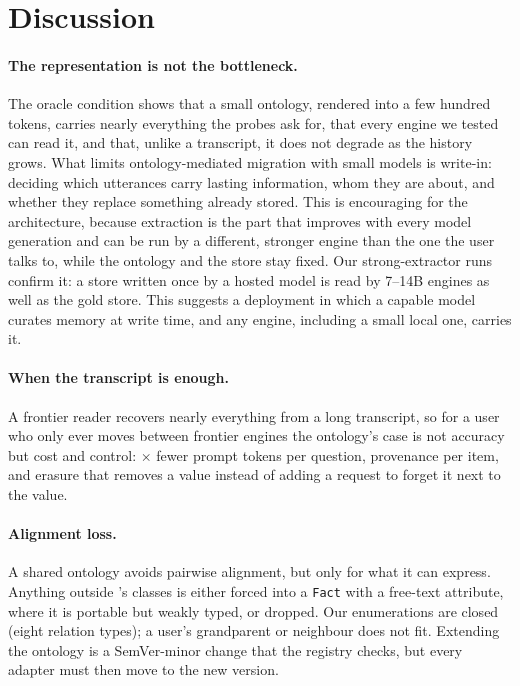\section{Discussion}\label{sec:discussion}

\paragraph{The representation is not the bottleneck.} The oracle condition shows that a small
ontology, rendered into a few hundred tokens, carries nearly everything the probes ask for, that
every engine we tested can read it, and that, unlike a transcript, it does not degrade as the
history grows. What limits
ontology-mediated migration with small models is write-in: deciding which utterances carry lasting
information, whom they are about, and whether they replace something already stored. This is
encouraging for the architecture, because extraction is the part that improves with every model
generation and can be run by a different, stronger engine than the one the user talks to, while
the ontology and the store stay fixed. Our strong-extractor runs confirm it: a store written once
by a hosted model is read by 7--14B engines as well as the gold store. This suggests a deployment
in which a capable model curates memory at write time, and any engine, including a small local
one, carries it.

\paragraph{When the transcript is enough.} A frontier reader recovers nearly everything from a
long transcript, so for a user who only ever moves between frontier engines the ontology's case is
not accuracy but cost and control: $\times$ fewer prompt tokens per
question, provenance per item, and erasure that removes a value instead of adding a request to
forget it next to the value.

\paragraph{Alignment loss.} A shared ontology avoids pairwise alignment, but only for what it can
express. Anything outside \memcore's classes is either forced into a \texttt{Fact} with a free-text
attribute, where it is portable but weakly typed, or dropped. Our enumerations are closed (eight
relation types); a user's grandparent or neighbour does not fit. Extending the ontology is a
SemVer-minor change that the registry checks, but every adapter must then move to the new version.

